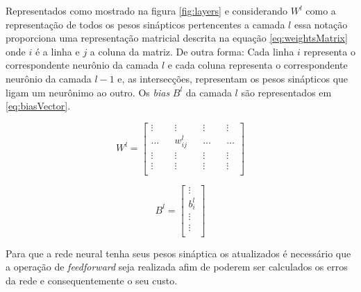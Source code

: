 \begin{apendicesenv}
	\par Representados como mostrado na figura \ref{fig:layers} e considerando $W^l$ como a representação de todos os pesos sinápticos pertencentes a camada $l$ essa notação proporciona uma representação matricial descrita na equação \ref{eq:weightsMatrix} onde $i$ é a linha e $j$ a coluna da matriz. De outra forma: Cada linha $i$ representa o correspondente neurônio da camada $l$ e cada coluna representa o correspondente neurônio da camada $l-1$ e, as intersecções, representam os pesos sinápticos que ligam um neurônimo ao outro. Os \textit{bias} $B^l$ da camada $l$ são representados em \ref{eq:biasVector}. 
	
	\begin{equation}\label{eq:weightsMatrix}
		W^l = \begin{bmatrix}
			\vdots && \vdots && \vdots && \vdots \\
			\hdots && w^l_{ij} && \hdots && \hdots \\
			\vdots && \vdots && \vdots && \vdots \\
			\vdots && \vdots && \vdots && \vdots \\
		\end{bmatrix}
	\end{equation}

	\begin{equation}\label{eq:biasVector}
		B^l = \begin{bmatrix}
			\vdots \\
			b^l_i  \\
			\vdots \\
			\vdots \\
		\end{bmatrix}
	\end{equation}

	\par Para que a rede neural tenha seus pesos sináptica os atualizados é necessário que a operação de \textit{feedforward} seja realizada afim de poderem ser calculados os erros da rede e consequentemente o seu custo.
	

\end{apendicesenv}
